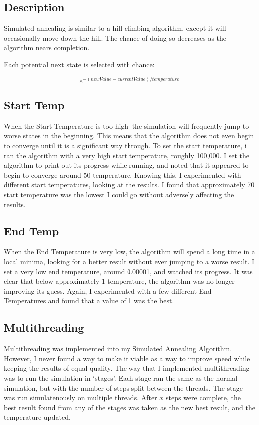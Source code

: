 \documentclass[a4paper, 11pt,table]{article}
\begin{document}
\subsection{Description}
Simulated annealing is similar to a hill climbing algorithm, except it will occasionally move down the hill. The chance of doing so decreases as the algorithm nears completion.

Each potential next state is selected with chance:

\begin{equation}
	e^{-(newValue - currentValue) / temperature}
\end{equation}

\subsection{Start Temp}
When the Start Temperature is too high, the simulation will frequently jump to worse states in the beginning. This means that the algorithm does not even begin to converge until it is a significant way through. To set the start temperature, i ran the algorithm with a very high start temperature, roughly 100,000. I set the algorithm to print out its progress while running, and noted that it appeared to begin to converge around 50 temperature. Knowing this, I experimented with different start temperatures, looking at the results. I found that approximately 70 start temperature was the lowest I could go without adversely affecting the results.

\subsection{End Temp}
When the End Temperature is very low, the algorithm will spend a long time in a local minima, looking for a better result without ever jumping to a worse result. I set a very low end temperature, around 0.00001, and watched its progress. It was clear that below approximately 1 temperature, the algorithm was no longer improving its guess. Again, I experimented with a few different End Temperatures and found that a value of 1 was the best.

\subsection{Multithreading}
Multithreading was implemented into my Simulated Annealing Algorithm. However, I never found a way to make it viable as a way to improve speed while keeping the results of equal quality. The way that I implemented multithreading was to run the simulation in `stages'. Each stage ran the same as the normal simulation, but with the number of steps split between the threads. The stage was run simulatenously on multiple threads. After $x$ steps were complete, the best result found from any of the stages was taken as the new best result, and the temperature updated.
\end{document}
